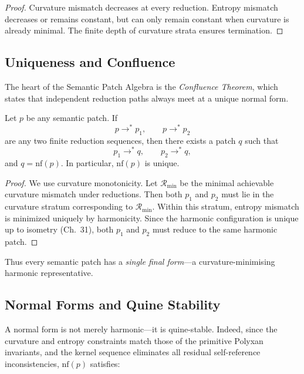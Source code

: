 \begin{proof}
Curvature mismatch decreases at every reduction.
Entropy mismatch decreases or remains constant, but can only
remain constant when curvature is already minimal.
The finite depth of curvature strata ensures termination.
\end{proof}

\subsection{Uniqueness and Confluence}
\label{subsec:79-3-confluence}

The heart of the Semantic Patch Algebra is the
\emph{Confluence Theorem}, which states that
independent reduction paths always meet at a unique normal form.

\begin{theorem}
\label{thm:79-confluence}
Let $p$ be any semantic patch.  
If
\[
p \longrightarrow^{\!*} p_1,
\qquad
p \longrightarrow^{\!*} p_2
\]
are any two finite reduction sequences,
then there exists a patch $q$ such that
\[
p_1 \longrightarrow^{\!*} q,
\qquad
p_2 \longrightarrow^{\!*} q,
\]
and $q = \mathrm{nf}(p)$.
In particular, $\mathrm{nf}(p)$ is unique.
\end{theorem}

\begin{proof}
We use curvature monotonicity.
Let $\mathcal{R}_{\min}$ be the minimal achievable curvature mismatch under reductions.
Then both $p_1$ and $p_2$ must lie in the curvature stratum corresponding to $\mathcal{R}_{\min}$.
Within this stratum, entropy mismatch is minimized uniquely by harmonicity.
Since the harmonic configuration is unique up to isometry (Ch.~31),
both $p_1$ and $p_2$ must reduce to the same harmonic patch.
\end{proof}

Thus every semantic patch has a \emph{single final form}—a curvature-minimising harmonic representative.

\subsection{Normal Forms and Quine Stability}
\label{subsec:79-3-quine}

A normal form is not merely harmonic—it is quine-stable.
Indeed, since the curvature and entropy constraints match those of the primitive
Polyxan invariants,
and the kernel sequence eliminates all residual self-reference inconsistencies,
$\mathrm{nf}(p)$ satisfies:

